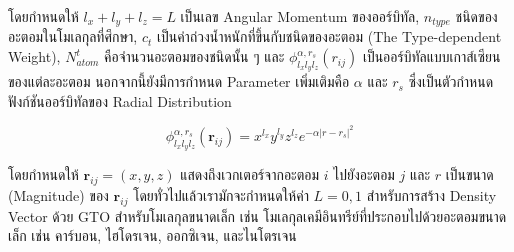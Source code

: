 \noindent โดยกำหนดให้ $l_{x}+l_{y}+l_{z} = L$ เป็นเลข Angular Momentum ของออร์บิทัล, $n_{type}$ ชนิดของอะตอมในโมเลกุลที่ศึกษา, 
$c_{t}$ เป็นค่าถ่วงน้ำหนักที่ขึ้นกับชนิดของอะตอม (The Type-dependent Weight), $N^{t}_{atom}$ คือจำนวนอะตอมของชนิดนั้น ๆ
และ $\phi^{\alpha,r_{s}}_{l_{x}l_{y}l_{z}} (r_{ij})$ เป็นออร์บิทัลแบบเกาส์เซียนของแต่ละอะตอม นอกจากนี้ยังมีการกำหนด 
Parameter เพิ่มเติมคือ $\alpha$ และ $r_{s}$ ซึ่งเป็นตัวกำหนดฟังก์ชันออร์บิทัลของ Radial Distribution

\begin{equation}
    \phi^{\alpha,r_{s}}_{l_{x}l_{y}l_{z}} (\boldsymbol{r}_{ij}) = x^{l_{x}}y^{l_{y}}z^{l_{z}} e^{-\alpha 
    |r-r_{s}|^{2}}
\end{equation}

\noindent โดยกำหนดให้ $\boldsymbol{r}_{ij} = (x,y,z)$ แสดงถึงเวกเตอร์จากอะตอม $i$ ไปยังอะตอม $j$ และ $r$ 
เป็นขนาด (Magnitude) ของ $\boldsymbol{r}_{ij}$ โดยทั่วไปแล้วเรามักจะกำหนดให้ค่า $L=0,1$ สำหรับการสร้าง Density Vector ด้วย GTO
สำหรับโมเลกุลขนาดเล็ก เช่น โมเลกุลเคมีอินทรีย์ที่ประกอบไปด้วยอะตอมขนาดเล็ก เช่น คาร์บอน, ไฮโดรเจน, ออกซิเจน, และไนโตรเจน\cite{kwac2021}
